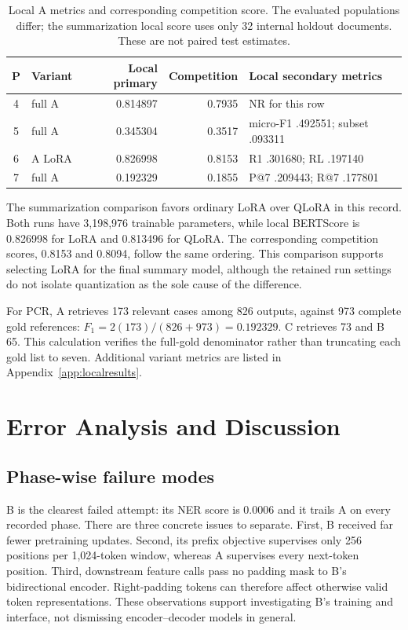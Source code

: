 \documentclass[11pt, oneside]{article}
\newcommand{\mainbreak}{\clearpage}
\begin{document}
\begin{table}[H]\centering\small
\caption{Local A metrics and corresponding competition score. The evaluated populations differ;
the summarization local score uses only 32 internal holdout documents. These are not paired test estimates.}
\label{tab:local}
\begin{tabular}{clrrl}
\toprule P & Variant & Local primary & Competition & Local secondary metrics\\\midrule
4 & full A & 0.814897 & 0.7935 & NR for this row\\
5 & full A & 0.345304 & 0.3517 & micro-F1 .492551; subset .093311\\
6 & A LoRA & 0.826998 & 0.8153 & R1 .301680; RL .197140\\
7 & full A & 0.192329 & 0.1855 & P@7 .209443; R@7 .177801\\\bottomrule
\end{tabular}\end{table}

The summarization comparison favors ordinary LoRA over QLoRA in this record. Both runs have
3,198,976 trainable parameters, while local BERTScore is 0.826998 for LoRA and 0.813496 for QLoRA.
The corresponding competition scores, 0.8153 and 0.8094, follow the same ordering. This comparison
supports selecting LoRA for the final summary model, although the retained run settings do not
isolate quantization as the sole cause of the difference.

For PCR, A retrieves 173 relevant cases among 826 outputs, against 973 complete gold references:
$F_1=2(173)/(826+973)=0.192329$. C retrieves 73 and B 65. This calculation verifies the full-gold
denominator rather than truncating each gold list to seven. Additional variant metrics are
listed in Appendix~\ref{app:localresults}.

\mainbreak
\section{Error Analysis and Discussion}
\subsection{Phase-wise failure modes}
B is the clearest failed attempt: its NER score is 0.0006 and it trails A on every recorded phase.
There are three concrete issues to separate. First, B received far fewer pretraining updates. Second,
its prefix objective supervises only 256 positions per 1,024-token window, whereas A supervises every
next-token position. Third, downstream feature calls pass no padding mask to B's bidirectional encoder.
Right-padding tokens can therefore affect otherwise valid token representations. These observations
support investigating B's training and interface, not dismissing encoder--decoder models in general.
\end{document}
